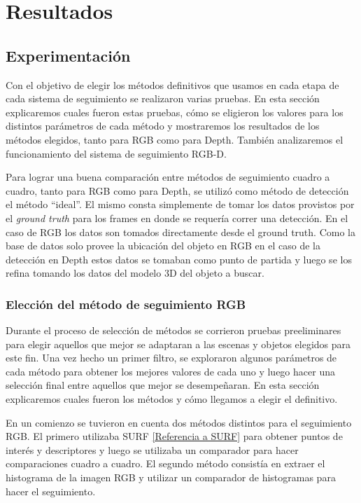 \chapter{Resultados}

\section{Experimentación}
Con el objetivo de elegir los métodos definitivos que usamos en cada etapa de cada sistema de seguimiento se realizaron varias pruebas. En esta sección explicaremos cuales fueron estas pruebas, cómo se eligieron los valores para los distintos parámetros de cada método y mostraremos los resultados de los métodos elegidos, tanto para RGB como para Depth. También analizaremos el funcionamiento del sistema de seguimiento RGB-D.

Para lograr una buena comparación entre métodos de seguimiento cuadro a cuadro, tanto para RGB como para Depth, se utilizó como método de detección el método ``ideal''. El mismo consta simplemente de tomar los datos provistos por el \textit{ground truth} para los frames en donde se requería correr una detección. En el caso de RGB los datos son tomados directamente desde el ground truth. Como la base de datos solo provee la ubicación del objeto en RGB en el caso de la detección en Depth estos datos se tomaban como punto de partida y luego se los refina tomando los datos del modelo 3D del objeto a buscar.

\subsection{Elección del método de seguimiento RGB}
Durante el proceso de selección de métodos se corrieron pruebas preeliminares para elegir aquellos que mejor se adaptaran a las escenas y objetos elegidos para este fin. Una vez hecho un primer filtro, se exploraron algunos parámetros de cada método para obtener los mejores valores de cada uno y luego hacer una selección final entre aquellos que mejor se desempeñaran. En esta sección explicaremos cuales fueron los métodos y cómo llegamos a elegir el definitivo.

En un comienzo se tuvieron en cuenta dos métodos distintos para el seguimiento RGB. El primero utilizaba SURF \ref{Referencia a SURF} para obtener puntos de interés y descriptores y luego se utilizaba un comparador para hacer comparaciones cuadro a cuadro. El segundo método consistía en extraer el histograma de la imagen RGB y utilizar un comparador de histogramas para hacer el seguimiento. 

